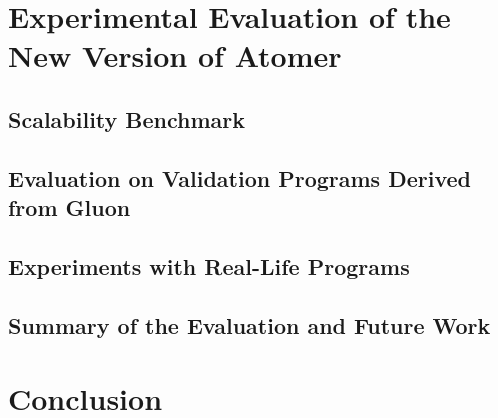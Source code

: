 


\chapter{Experimental Evaluation of the New Version of Atomer}
\label{chap:exp}




\section{Scalability Benchmark}
\label{sec:expScal}

\cite{deadlockKroening}


\section{Evaluation on Validation Programs Derived from Gluon}
\label{sec:expGluon}


\section{Experiments with Real-Life Programs}
\label{sec:expReal}


\section{Summary of the Evaluation and Future Work}
\label{sec:expSummary}






\chapter{Conclusion}
\label{chap:conc}

